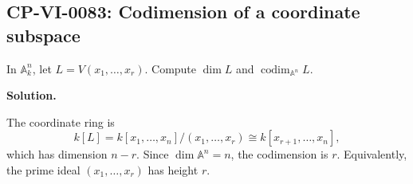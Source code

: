 
\subsection*{CP-VI-0083: Codimension of a coordinate subspace}

In $\mathbb A_k^n$, let $L=V(x_1,\dots,x_r)$. Compute $\dim L$ and $\operatorname{codim}_{\mathbb A^n}L$.

\medskip
\noindent\textbf{Solution.}

The coordinate ring is
\[
k[L]=k[x_1,\dots,x_n]/(x_1,\dots,x_r)\cong k[x_{r+1},\dots,x_n],
\]
which has dimension $n-r$. Since $\dim\mathbb A^n=n$, the codimension is $r$. Equivalently, the prime ideal $(x_1,\dots,x_r)$ has height $r$.

